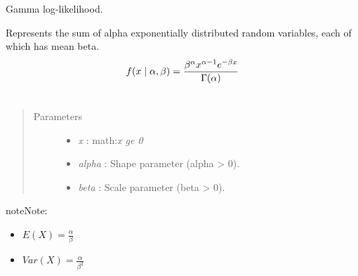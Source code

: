 \documentclass[letterpaper,10pt,english]{sphinxmanual}
\begin{document}
\begin{fulllineitems}
\label{distributions:pymc.distributions.gamma_like}
Gamma log-likelihood.

Represents the sum of alpha exponentially distributed random variables, each
of which has mean beta.
\begin{gather}
\begin{split}f(x \mid \alpha, \beta) = \frac{\beta^{\alpha}x^{\alpha-1}e^{-\beta x}}{\Gamma(\alpha)}\end{split}\notag\\\begin{split}\end{split}\notag
\end{gather}\begin{quote}\begin{description}
\item[{Parameters }] \leavevmode\begin{itemize}
\item {} 
\emph{x} : math:\emph{x ge 0}

\item {} 
\emph{alpha} : Shape parameter (alpha \textgreater{} 0).

\item {} 
\emph{beta} : Scale parameter (beta \textgreater{} 0).

\end{itemize}

\end{description}\end{quote}

\begin{notice}{note}{Note:}\begin{itemize}
\item {} 
$E(X) = \frac{\alpha}{\beta}$

\item {} 
$Var(X) = \frac{\alpha}{\beta^2}$

\end{itemize}
\end{notice}

\end{fulllineitems}

\end{document}
